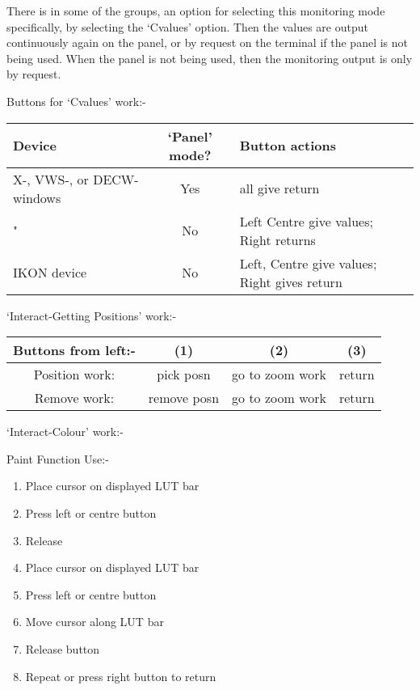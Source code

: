 {{  There is in some of the groups, an option for selecting this
  monitoring mode specifically, by selecting the `Cvalues' option.
  Then the values are output continuously again on the panel, or by
  request on the terminal if the panel is not being used.
  When the panel is not being used, then the monitoring output is only
  by request.
                                                                               
   Buttons for `Cvalues' work:-

\hspace*{4ex}\begin{tabular}{|p{2in}|c|l|} \hline
         Device      &`Panel' mode?  &  Button actions \\ \hline
      X-, VWS-, or DECW- windows &  
                                      Yes  &          all give return \\
       \hspace*{6ex} "       &   No       &     Left Centre give values;
                                        Right returns \\
       IKON device   &   No        &    Left, Centre give values;
                                        Right gives return \\ \hline
\end{tabular}                                              

                                                                               
  `Interact-Getting Positions' work:-

\hspace*{4ex}\begin{tabular}{|c|c|c|c|}\hline
  Buttons from left:-   & (1)      &     (2)    & (3) \\ \hline
   Position work: &  pick posn &    go to zoom work & return \\ 
     Remove work: &remove posn &    go to zoom work & return \\ \hline
\end{tabular}
                                                                               
  `Interact-Colour' work:-
                                                                               
       Paint Function Use:-

\begin{enumerate}
\item    Place cursor on displayed LUT bar
\item    Press left or centre button
\item    Release
\item    Place cursor on displayed LUT bar
\item    Press left or centre button
\item    Move cursor along LUT bar
\item    Release button
\item    Repeat or press right button to return
\end{enumerate}
                                                                               
}}
